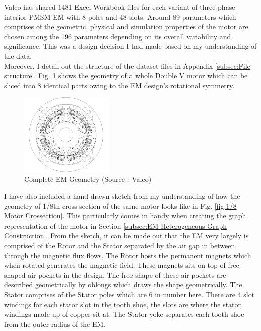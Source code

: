 \documentclass{report} %
\begin{document}
Valeo has shared 1481 Excel Workbook files for each variant of three-phase interior \ac{PMSM} \ac{EM} with 8 poles and 48 slots. 
Around 89 parameters which comprises of the geometric, physical and simulation properties of the motor are chosen among the 196 parameters depending on its overall variability and significance.
This was a design decision I had made based on my understanding of the data.\\
Moreover, I detail out the structure of the dataset files in Appendix \ref{subsec:File structure}.
Fig. \ref{fig:Full Motor} shows the geometry of a whole Double V motor which can be sliced into 8 identical parts owing to the \ac{EM} design's rotational symmetry.
\begin{figure}[H]
    \centering
    \includegraphics[width=0.4\textwidth]{./ReportImages/FullMotorv2.png} 
    \caption{Complete \ac{EM} Geometry (Source : Valeo)}
    \label{fig:Full Motor}
\end{figure}

I have also included a hand drawn sketch from my understanding of how the geometry of 1/8th cross-section of the same motor looks like in Fig. \ref{fig:1/8 Motor Crossection}.
This particularly comes in handy when creating the graph representation of the motor in Section \ref{subsec:EM Heterogeneous Graph Construction}.
From the sketch, it can be made out that the \ac{EM} very largely is comprised of the Rotor and the Stator separated by the air gap in between through the magnetic flux flows.
The Rotor hosts the permanent magnets which when rotated generates the magnetic field. These magnets sits on top of free shaped air pockets in the design. 
The free shape of these air pockets are described geometrically by oblongs which draws the shape geometrically.
The Stator comprises of the Stator poles which are 6 in number here. There are 4 slot windings for each stator slot in the tooth shoe, the slots are where the stator windings made 
up of copper sit at. The Stator yoke separates each tooth shoe from the outer radius of the \ac{EM}.
\end{document}
